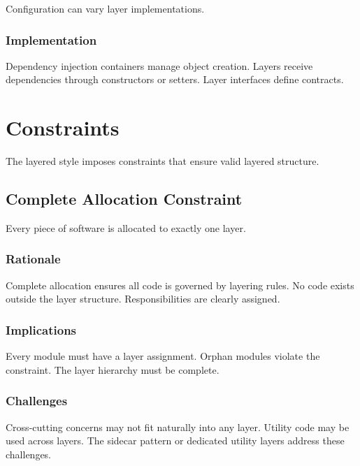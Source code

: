 \documentclass[11pt]{article}
\begin{document}
Configuration can vary layer implementations.

\subsubsection{Implementation}

Dependency injection containers manage object creation. Layers receive dependencies through constructors or setters. Layer interfaces define contracts.

\section{Constraints}

The layered style imposes constraints that ensure valid layered structure.

\subsection{Complete Allocation Constraint}

Every piece of software is allocated to exactly one layer.

\subsubsection{Rationale}

Complete allocation ensures all code is governed by layering rules. No code exists outside the layer structure. Responsibilities are clearly assigned.

\subsubsection{Implications}

Every module must have a layer assignment. Orphan modules violate the constraint. The layer hierarchy must be complete.

\subsubsection{Challenges}

Cross-cutting concerns may not fit naturally into any layer. Utility code may be used across layers. The sidecar pattern or dedicated utility layers address these challenges.
\end{document}
